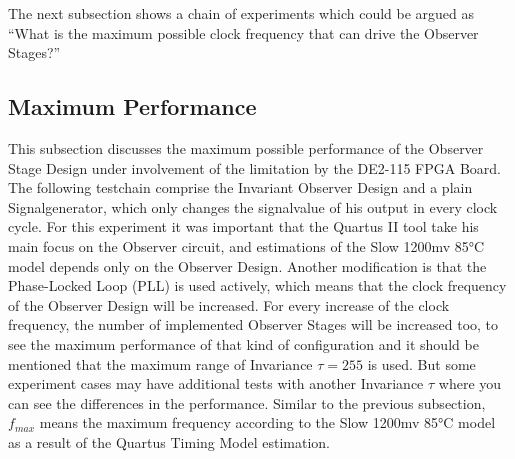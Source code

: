 The next subsection shows a chain of experiments which could be argued as ``What is the maximum possible clock frequency that can drive the Observer Stages?''

\subsection{Maximum Performance}
\label{chapter:4:section:3:subsection:2}
This subsection discusses the maximum possible performance of the Observer Stage Design under involvement of the limitation by the DE2-115 FPGA Board.
The following testchain comprise the Invariant Observer Design and a plain Signalgenerator, which only changes the signalvalue of his output in every clock cycle.
For this experiment it was important that the Quartus II tool take his main focus on the Observer circuit, and estimations of the Slow 1200mv 85°C model depends
only on the Observer Design.
Another modification is that the Phase-Locked Loop (PLL) is used actively, which means that the clock frequency of the Observer Design will be increased.
For every increase of the clock frequency, the number of implemented Observer Stages will be increased too, to see the maximum performance of that kind of configuration and
it should be mentioned that the maximum range of Invariance $\tau = 255$ is used.
But some experiment cases may have additional tests with another Invariance $\tau$ where you can see the differences in the performance. 
Similar to the previous subsection, $f_{max}$ means the maximum frequency according to the Slow 1200mv 85°C model as a result of the Quartus Timing Model estimation.\\

